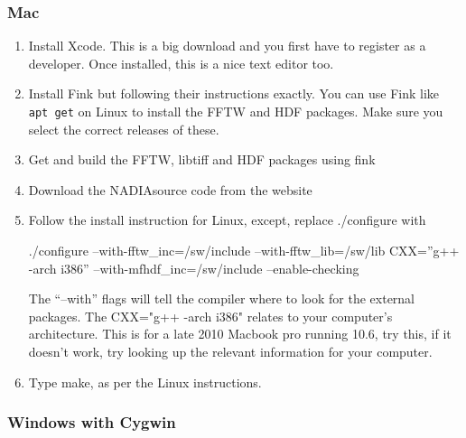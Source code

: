 \documentclass[]{nadia}
\def\name{NADIA}
\begin{document}
\subsubsection{Mac}

\begin{enumerate}
\item Install Xcode. This is a big download and you first have
  to register as a developer. Once installed, this is a nice text
  editor too.
\item Install Fink\cite{fink} but following their instructions exactly.
  You can use Fink like {\tt apt get} on Linux to install the FFTW and
  HDF packages. Make sure you select the correct releases of these.
\item Get and build the FFTW, libtiff and HDF packages using fink
\item Download the \name source code from the website
\item Follow the install instruction for Linux, except, replace ./configure with 
\begin{myverbatim}
  ./configure --with-fftw_inc=/sw/include --with-fftw_lib=/sw/lib CXX=''g++ -arch i386'' --with-mfhdf_inc=/sw/include --enable-checking
\end{myverbatim}
The ``--with'' flags will tell the compiler where to look for the
external packages.  The CXX="g++ -arch i386" relates to your
computer's architecture. This is for a late 2010 Macbook pro running
10.6, try this, if it doesn't work, try looking up the relevant
information for your computer. %
\item Type make, as per the Linux instructions.
\end{enumerate}

\subsubsection{Windows with Cygwin}
\end{document}
